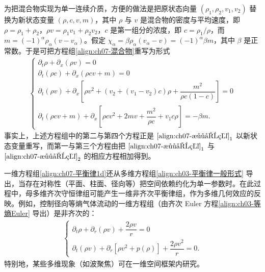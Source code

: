 \documentclass[../../main.tex]{subfiles}
\begin{document}
为把混合物实现为单一连续介质，方便的做法是把原状态向量 $(\rho_1,\rho_2,v_1,v_2)$ 替换为新状态变量 $(\rho,c,v,m)$，其中 $\rho$ 与 $v$ 是混合物的密度与平均速度，即 $\rho=\rho_1+\rho_2$，$\rho v=\rho_1 v_1+\rho_2 v_2$，$c$ 是第一组分的浓度，即 $c=\rho_1/\rho$，而 $m=(-1)^\alpha\rho_\alpha(v-v_\alpha)$。假定 $\chi_\alpha=\beta\rho_\alpha(v_\alpha-v)=(-1)^\alpha\beta m$，其中 $\beta$ 是正常数。于是可把方程组\eqref{align:ch07-混合物}重写为形式
\begin{align}
\begin{cases}
\partial_t\rho+\partial_x(\rho v)=0\\
\partial_t(\rho c)+\partial_x(\rho c v+m)=0\\
\partial_t(\rho v)+\partial_x\left[\rho v^2+(v_2+(v_1-v_2)c)\rho+\dfrac{m^2}{\rho c(1-c)}\right]=0\\
\partial_t(\rho c v+m)+\partial_x\left[\rho c v^2+2mv+\dfrac{m^2}{\rho c}+v_1 c\rho\right]=-\beta m.
\end{cases}
\label{align:ch07-混合物重写}
\end{align}
事实上，上述方程组中的第二与第四个方程正是 $\eqref{align:ch07-混合物}_1$ 以新状态变量重写，而第一与第三个方程由把 $\eqref{align:ch07-混合物}_1$ 与 $\eqref{align:ch07-混合物}_2$ 的相应方程相加得到。

一维方程组\eqref{align:ch07-平衡律1d}还从多维方程组\eqref{align:ch03-平衡律一般形式}
导出，当存在对称性（平面、柱面、径向等）把空间依赖约化为单一参数时。在此过程中，母多维齐次守恒律组可能产生一维非齐次平衡律组，作为多维几何效应的反映。例如，控制径向等熵气体流动的一维方程组（由齐次 Euler 方程\eqref{align:ch03-等熵Euler}
导出）是非齐次的：
\begin{align}
\begin{cases}
\partial_t\rho+\partial_r(\rho v)+\dfrac{2\rho v}{r}=0\\
\partial_t(\rho v)+\partial_r[\rho v^2+p(\rho)]+\dfrac{2\rho v^2}{r}=0.
\end{cases}
\label{align:ch07-径向流}
\end{align}
特别地，某些多维现象（如波聚焦）可在一维空间框架内研究。
\end{document}
